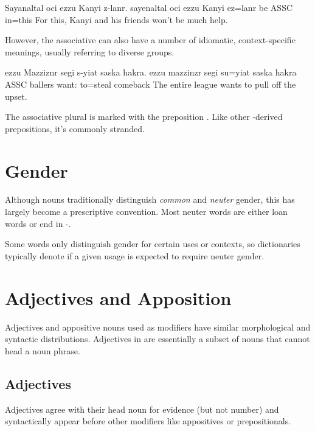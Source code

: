 \begin{example} \label{ex:ezzu_basic}
    \script Sayanaltal oci ezzu Kanyi z-lanr.
    \bits sayenaltal oci ezzu Kanyi ez=lanr
     be ASSC  in=this
    \tr For this, Kanyi and his friends won't be much help.
\end{example}

However, the associative can also have a number of idiomatic, context-specific meanings, usually referring to diverse groups.

\begin{example} \label{ex:ezzu_idiom}
    \script ezzu Mazziznr segi s-yiat saska hakra.
    \bits ezzu mazzinzr segi su=yiat {saska hakra}
    \gloss ASSC ballers want: to=steal comeback
    \tr The entire league wants to pull off the upset.
\end{example}

The associative plural is marked with the preposition . Like other -derived prepositions, it's commonly stranded.

\section{Gender}
Although nouns traditionally distinguish \emph{common} and \emph{neuter} gender, this has largely become a prescriptive convention.  Most neuter words are either loan words or end in -.

Some words only distinguish gender for certain uses or contexts, so dictionaries typically denote if a given usage is expected to require neuter gender.

\section{Adjectives and Apposition}
Adjectives and appositive nouns used as modifiers have similar morphological and syntactic distributions. Adjectives in \langname{} are essentially a subset of nouns that cannot head a noun phrase.

\subsection{Adjectives}
Adjectives agree with their head noun for evidence (but not number) and syntactically appear before other modifiers like appositives or prepositionals.


